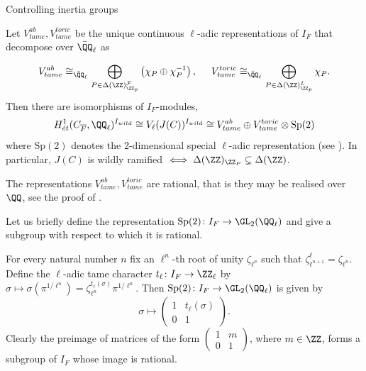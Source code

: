 \documentclass[11pt,a4paper]{article}
\newcommand{\F}{\mathcal{F}}
\begin{document}
\begin{section}{Controlling inertia groups}
\begin{theorem}{\cite[Thm 6.4]{Models_Curves_DVR}}
Let $V^{ab}_{tame}, V^{toric}_{tame}$ be the unique continuous $\ell$-adic representations of $I_F$ that decompose over $\Bar{\QQ}_\ell$ as

$$ V^{ab}_{tame} \cong_{\Bar{\QQ}_\ell} \bigoplus_{P \in \Delta(\ZZ)_{\ZZ_p}^\F}\left(\chi_P \oplus \chi_P^{-1}\right), \hspace{5mm} V^{toric}_{tame} \cong_{\Bar{\QQ}_\ell} \bigoplus_{P \in \Delta(\ZZ)_{\ZZ_p}^L}\chi_P.$$
Then there are isomorphisms of $I_F$-modules,
$$H_{\acute{e}t}^1(C_{\overline{F}},\QQ_\ell)^{I_{wild}} \cong V_\ell(J(C))^{I_{wild}} \cong V^{ab}_{tame}\oplus  V^{toric}_{tame} \otimes \mathrm{Sp}(2)$$
where $\mathrm{Sp}(2)$ denotes the 2-dimensional special $\ell$-adic representation (see \cite[4.1.4, 4.2.1]{Tate_number_theoretic_background}).
In particular, $J(C)$ is wildly ramified $\iff \Delta(\ZZ)_{\ZZ_P}\subsetneq \Delta(\ZZ)$.
\end{theorem}

\begin{remark}
\label{remark:ab_toric_tame_are_both_rational}
The representations $V^{ab}_{tame}, V^{toric}_{tame}$ are rational, that is they may be realised over $\QQ$, see the proof of \cite[Thm. 6.4]{Models_Curves_DVR}.
\end{remark}

\begin{remark}
\label{remark:Sp_has_rational_restriction}
    Let us briefly define the representation $\mathrm{Sp}(2)\colon I_F \rightarrow \GL_2(\QQ_\ell)$ and give a subgroup with respect to which it is rational.

    For every natural number $n$ fix an $\ell^n$-th root of unity $\zeta_{\ell^n}$ such that $\zeta_{\ell^{n+1}}^\ell = \zeta_{\ell^n}$.
    Define the $\ell$-adic tame character $t_\ell\colon I_F \rightarrow \ZZ_\ell$ by $\sigma \mapsto \sigma(\pi^{1/\ell^n}) = \zeta_{\ell^n}^{t_\ell(\sigma)}{\pi^{1/\ell^n}} $.
    Then $\mathrm{Sp}(2)\colon I_F \rightarrow \GL_2(\QQ_\ell)$ is given by 
    \[\sigma \mapsto \begin{pmatrix}
        1 & t_\ell(\sigma) \\
        0 & 1
    \end{pmatrix}.\]
    Clearly the preimage of matrices of the form $\left(\begin{smallmatrix}
    1 & m \\
       0  & 1
    \end{smallmatrix}
    \right)$,
    where $m \in \ZZ$, forms a subgroup of $I_F$ whose image is rational.
\end{remark}



\end{section}
\end{document}
